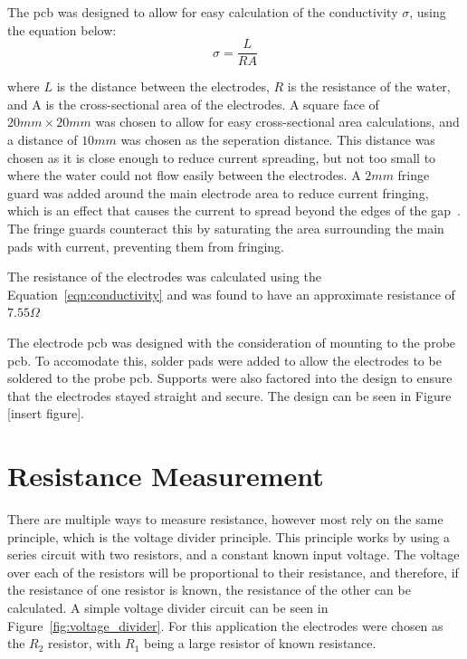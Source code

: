 The \gls{pcb} was designed to allow for easy calculation of the conductivity $\sigma$, using the equation below:
\begin{equation}\label{eqn:conductivity}
    \sigma = \frac{L}{RA}
\end{equation}

where $L$ is the distance between the electrodes, $R$ is the resistance of the water, and A is the cross-sectional area of the electrodes.
A square face of $20mm\times 20mm$ was chosen to allow for easy cross-sectional area calculations, and a distance of $10mm$ was chosen as the seperation distance.
This distance was chosen as it is close enough to reduce current spreading, but not too small to where the water could not flow easily between the electrodes.
A $2mm$ fringe guard was added around the main electrode area to reduce current fringing, which is an effect that causes the current to spread beyond the edges of the gap~\cite{roshen_fringing}.
The fringe guards counteract this by saturating the area surrounding the main pads with current, preventing them from fringing.

The resistance of the electrodes was calculated using the Equation~\ref{eqn:conductivity} and was found to have an approximate resistance of $7.55\Omega$

The electrode \gls{pcb} was designed with the consideration of mounting to the probe \gls{pcb}.
To accomodate this, solder pads were added to allow the electrodes to be soldered to the probe \gls{pcb}.
Supports were also factored into the design to ensure that the electrodes stayed straight and secure.
The design can be seen in Figure [insert figure]. %

\section{Resistance Measurement}\label{sec:res_mes}
There are multiple ways to measure resistance, however most rely on the same principle, which is the voltage divider principle.
This principle works by using a series circuit with two resistors, and a constant known input voltage.
The voltage over each of the resistors will be proportional to their resistance, and therefore, if the resistance of one resistor is known, the resistance of the other can be calculated.
A simple voltage divider circuit can be seen in Figure~\ref{fig:voltage_divider}.
For this application the electrodes were chosen as the $R_2$ resistor, with $R_1$ being a large resistor of known resistance.

